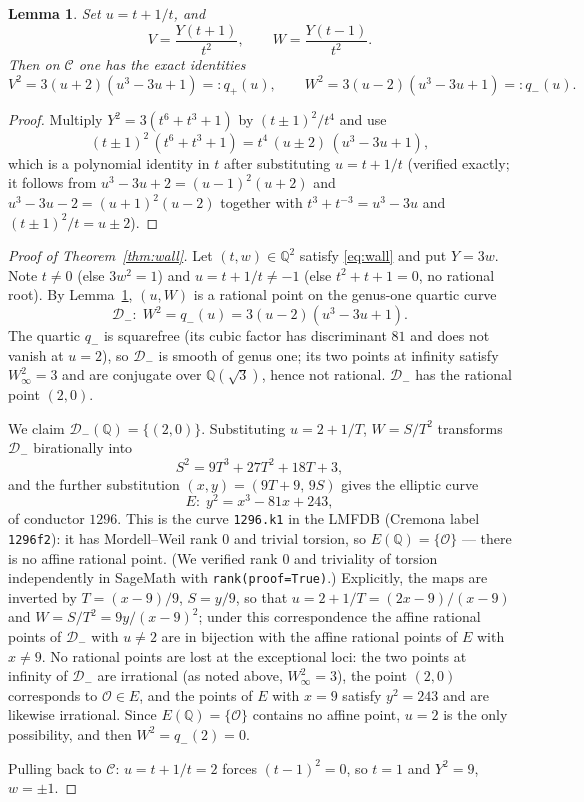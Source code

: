 \documentclass[11pt]{article}
\newtheorem{lemma}[theorem]{Lemma}
\theoremstyle{remark}
\newcommand{\Q}{\mathbb{Q}}
\begin{document}
\begin{lemma}\label{lem:quotients}
Set $u=t+1/t$, and
\[
V=\frac{Y(t+1)}{t^2},\qquad W=\frac{Y(t-1)}{t^2}.
\]
Then on $\mathcal{C}$ one has the exact identities
\[
V^2=3(u+2)(u^3-3u+1)=:q_+(u),\qquad W^2=3(u-2)(u^3-3u+1)=:q_-(u).
\]
\end{lemma}
\begin{proof}
Multiply $Y^2=3(t^6+t^3+1)$ by $(t\pm1)^2/t^4$ and use
\[
(t\pm1)^2\,(t^6+t^3+1)=t^4\,(u\pm2)\,(u^3-3u+1),
\]
which is a polynomial identity in $t$ after substituting $u=t+1/t$ (verified exactly; it follows from $u^3-3u+2=(u-1)^2(u+2)$ and $u^3-3u-2=(u+1)^2(u-2)$ together with $t^3+t^{-3}=u^3-3u$ and $(t\pm1)^2/t=u\pm2$).
\end{proof}

\begin{proof}[Proof of Theorem~\ref{thm:wall}]
Let $(t,w)\in\Q^2$ satisfy \eqref{eq:wall} and put $Y=3w$. Note $t\neq0$ (else $3w^2=1$) and $u=t+1/t\neq-1$ (else $t^2+t+1=0$, no rational root). By Lemma~\ref{lem:quotients}, $(u,W)$ is a rational point on the genus-one quartic curve
\[
\mathcal{D}_-:\; W^2=q_-(u)=3(u-2)(u^3-3u+1).
\]
The quartic $q_-$ is squarefree (its cubic factor has discriminant $81$ and does not vanish at $u=2$), so $\mathcal{D}_-$ is smooth of genus one; its two points at infinity satisfy $W_\infty^2=3$ and are conjugate over $\Q(\sqrt3)$, hence not rational. $\mathcal{D}_-$ has the rational point $(2,0)$.

We claim $\mathcal{D}_-(\Q)=\{(2,0)\}$. Substituting $u=2+1/T$, $W=S/T^2$ transforms $\mathcal{D}_-$ birationally into
\[
S^2=9T^3+27T^2+18T+3,
\]
and the further substitution $(x,y)=(9T+9,\,9S)$ gives the elliptic curve
\[
E:\; y^2=x^3-81x+243,
\]
of conductor $1296$. This is the curve \texttt{1296.k1} in the LMFDB \cite{LMFDB} (Cremona label \texttt{1296f2}): it has Mordell--Weil rank $0$ and trivial torsion, so $E(\Q)=\{\mathcal{O}\}$ --- there is no affine rational point. (We verified rank $0$ and triviality of torsion independently in SageMath with \texttt{rank(proof=True)}.) Explicitly, the maps are inverted by $T=(x-9)/9$, $S=y/9$, so that $u=2+1/T=(2x-9)/(x-9)$ and $W=S/T^{2}=9y/(x-9)^{2}$; under this correspondence the affine rational points of $\mathcal{D}_-$ with $u\neq2$ are in bijection with the affine rational points of $E$ with $x\neq9$. No rational points are lost at the exceptional loci: the two points at infinity of $\mathcal{D}_-$ are irrational (as noted above, $W_\infty^{2}=3$), the point $(2,0)$ corresponds to $\mathcal{O}\in E$, and the points of $E$ with $x=9$ satisfy $y^{2}=243$ and are likewise irrational. Since $E(\Q)=\{\mathcal{O}\}$ contains no affine point, $u=2$ is the only possibility, and then $W^2=q_-(2)=0$.

Pulling back to $\mathcal{C}$: $u=t+1/t=2$ forces $(t-1)^2=0$, so $t=1$ and $Y^2=9$, $w=\pm1$. \end{proof}
\end{document}
